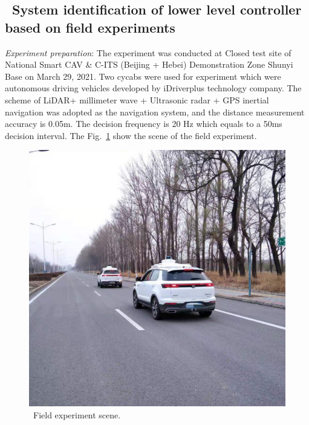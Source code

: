 \documentclass[trsc,nonblindrev]{informs3} %
\begin{document}
%
\begin{APPENDICES}
    \section{~System identification of lower level controller based on field experiments}
    \label{AppendixA}

    \textit{Experiment preparation}: The experiment was conducted at Closed test site of National Smart CAV \& C-ITS (Beijing + Hebei) Demonstration Zone Shunyi Base on March 29, 2021. Two cycabs were used for experiment which were autonomous driving vehicles developed by iDriverplus technology company. The scheme of LiDAR+ millimeter wave + Ultrasonic radar + GPS inertial navigation was adopted as the navigation system, and the distance measurement accuracy is 0.05m. The decision frequency is 20 Hz which equals to a 50ms decision interval. The Fig.~\ref{experiment} show the scene of the field experiment.

    \begin{figure}
        \centering
        \includegraphics[width=14cm]{figs/experiment.jpg}
        \caption{~Field experiment scene.}
        \label{experiment}
    \end{figure}


\end{APPENDICES}
\end{document}
